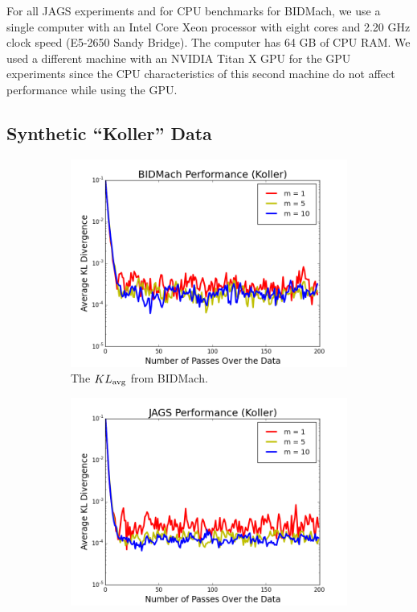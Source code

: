 \documentclass{article} %
\begin{document}
For all JAGS experiments and for CPU benchmarks for BIDMach, we use a
single computer with an Intel Core Xeon processor with eight cores and
2.20 GHz clock speed (E5-2650 Sandy Bridge). The computer has 64 GB of
CPU RAM. We used a different machine with an NVIDIA Titan X GPU for the
GPU experiments since the CPU characteristics of this second machine
do not affect performance while using the GPU.

\subsection{Synthetic ``Koller'' Data}\label{ssec:koller_data}

\begin{figure}[t]
\centering
\begin{subfigure}{.5\textwidth}
  \centering
  \includegraphics[width=0.9\linewidth]{fig_kldiv_koller_mb4_gpu}
  \caption{The $KL_{\rm avg}$ from BIDMach.}
  \label{fig:kl_bidmach}
\end{subfigure}%
\begin{subfigure}{.5\textwidth}
  \centering
  \includegraphics[width=0.9\linewidth]{fig_kldiv_50perc_jags}

\end{subfigure}
\end{figure}
\end{document}
